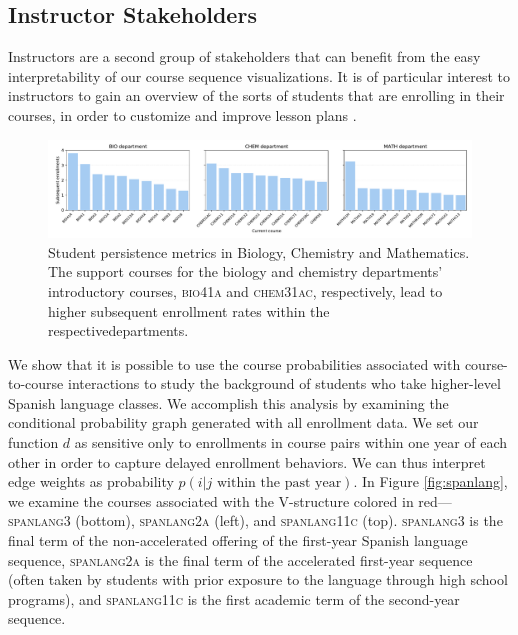 \documentclass{sigchi}
\begin{document}
\subsection{Instructor Stakeholders}
\label{sec:instructor_stakeholders}

Instructors are a second group of stakeholders that can benefit from
the easy interpretability of our course sequence visualizations. It is
of particular interest to instructors to gain an overview of the sorts
of students that are enrolling in their courses, in order to customize
and improve lesson plans \cite{Leaver2002}.

\begin{figure}[h!]
    \centering
    \includegraphics[width=18cm]{Figs/final-persistence.pdf}
    \caption{Student persistence metrics in Biology, Chemistry and
      Mathematics. The support courses for the biology and chemistry
      departments' introductory courses, \textsc{bio41a} and \textsc{chem31ac},
      respectively, lead to higher subsequent enrollment rates within
      the respectivedepartments.}
    \label{fig:persistence}
\end{figure}

We show that it is possible to use the
course probabilities associated with course-to-course interactions to
study the background of students who take higher-level Spanish
language classes. We accomplish this analysis by examining the
conditional probability graph generated with all enrollment data. We
set our function $d$ as sensitive only to enrollments in course pairs
within one year of each other in order to capture delayed enrollment
behaviors. We can thus interpret edge weights as probability $p(i|j
\text{ within the past year})$. In Figure \ref{fig:spanlang}, we examine the courses associated with
the V-structure colored in red--- \textsc{spanlang3} (bottom),
\textsc{spanlang2a} (left), and \textsc{spanlang11c} (top). \textsc{spanlang3} is the final term of the non-accelerated
offering of the first-year Spanish language sequence,
\textsc{spanlang2a} is the final term of the accelerated first-year
sequence (often taken by students with prior exposure to the language
through high school programs), and \textsc{spanlang11c} is the first
academic term of the second-year sequence.
\end{document}
